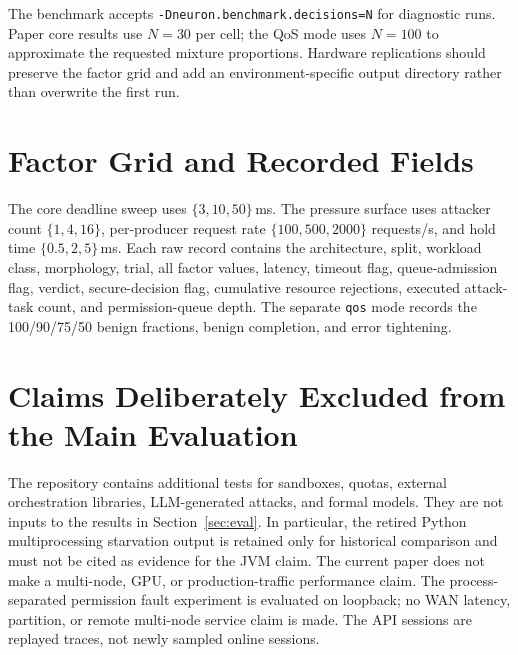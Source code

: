 The benchmark accepts \texttt{-Dneuron.benchmark.decisions=N} for diagnostic
runs. Paper core results use $N=30$ per cell; the QoS mode uses $N=100$ to
approximate the requested mixture proportions. Hardware replications should
preserve the factor grid and add an environment-specific output directory
rather than overwrite the first run.

\section{Factor Grid and Recorded Fields}

The core deadline sweep uses $\{3,10,50\}$\,ms. The pressure surface uses
attacker count $\{1,4,16\}$, per-producer request rate
$\{100,500,2000\}$ requests/s, and hold time $\{0.5,2,5\}$\,ms. Each raw
record contains the architecture, split, workload class, morphology, trial,
all factor values, latency, timeout flag, queue-admission flag, verdict,
secure-decision flag, cumulative resource rejections, executed attack-task
count, and permission-queue depth. The separate \texttt{qos} mode records
the 100/90/75/50 benign fractions, benign completion, and error tightening.

\section{Claims Deliberately Excluded from the Main Evaluation}

The repository contains additional tests for sandboxes, quotas, external
orchestration libraries, LLM-generated attacks, and formal models. They are
not inputs to the results in Section~\ref{sec:eval}. In particular, the
retired Python multiprocessing starvation output is retained only for
historical comparison and must not be cited as evidence for the JVM claim.
The current paper does not make a multi-node, GPU, or production-traffic
performance claim. The process-separated permission fault experiment is
evaluated on loopback; no WAN latency, partition, or remote multi-node service
claim is made. The API sessions are replayed traces, not newly sampled online
sessions.

